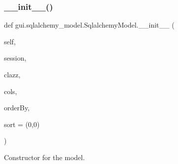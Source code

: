 \subsubsection{\texorpdfstring{\+\_\+\+\_\+init\+\_\+\+\_\+()}{\_\_init\_\_()}}
{\footnotesize\ttfamily def gui.\+sqlalchemy\+\_\+model.\+Sqlalchemy\+Model.\+\_\+\+\_\+init\+\_\+\+\_\+ (\begin{DoxyParamCaption}\item[{}]{self,  }\item[{}]{session,  }\item[{}]{clazz,  }\item[{}]{cols,  }\item[{}]{order\+By,  }\item[{}]{sort = {\ttfamily (0,0)} }\end{DoxyParamCaption})}



Constructor for the model. 



